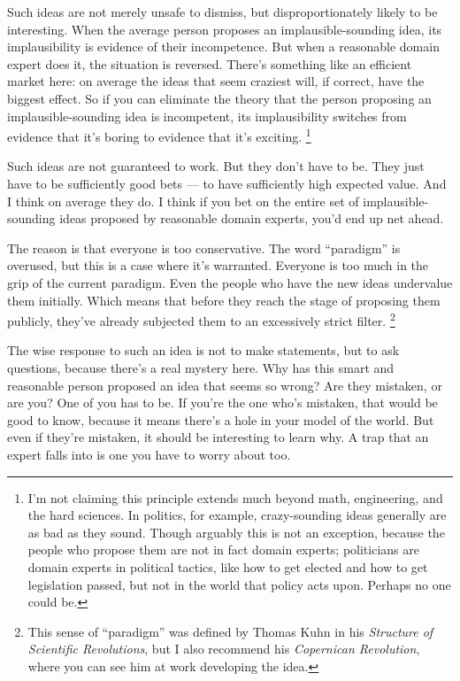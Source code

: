 \documentclass[12pt]{book}
\begin{document}
Such ideas are not merely unsafe to dismiss, but disproportionately
likely to be interesting. When the average person proposes an
implausible-sounding idea, its implausibility is evidence of their
incompetence. But when a reasonable domain expert does it, the situation
is reversed. There's something like an efficient market here: on average
the ideas that seem craziest will, if correct, have the biggest effect.
So if you can eliminate the theory that the person proposing an
implausible-sounding idea is incompetent, its implausibility switches
from evidence that it's boring to evidence that it's exciting.
\footnote{I'm not claiming this principle extends much beyond math,
engineering, and the hard sciences. In politics, for example,
crazy-sounding ideas generally are as bad as they sound. Though arguably
this is not an exception, because the people who propose them are not in
fact domain experts; politicians are domain experts in political
tactics, like how to get elected and how to get legislation passed, but
not in the world that policy acts upon. Perhaps no one could be.}

Such ideas are not guaranteed to work. But they don't have to be. They
just have to be sufficiently good bets --- to have sufficiently high
expected value. And I think on average they do. I think if you bet on
the entire set of implausible-sounding ideas proposed by reasonable
domain experts, you'd end up net ahead.

The reason is that everyone is too conservative. The word ``paradigm''
is overused, but this is a case where it's warranted. Everyone is too
much in the grip of the current paradigm. Even the people who have the
new ideas undervalue them initially. Which means that before they reach
the stage of proposing them publicly, they've already subjected them to
an excessively strict filter. \footnote{This sense of ``paradigm'' was defined by Thomas Kuhn in his
\emph{Structure of Scientific Revolutions}, but I also recommend his
\emph{Copernican Revolution}, where you can see him at work developing
the idea.}

The wise response to such an idea is not to make statements, but to ask
questions, because there's a real mystery here. Why has this smart and
reasonable person proposed an idea that seems so wrong? Are they
mistaken, or are you? One of you has to be. If you're the one who's
mistaken, that would be good to know, because it means there's a hole in
your model of the world. But even if they're mistaken, it should be
interesting to learn why. A trap that an expert falls into is one you
have to worry about too.
\end{document}
